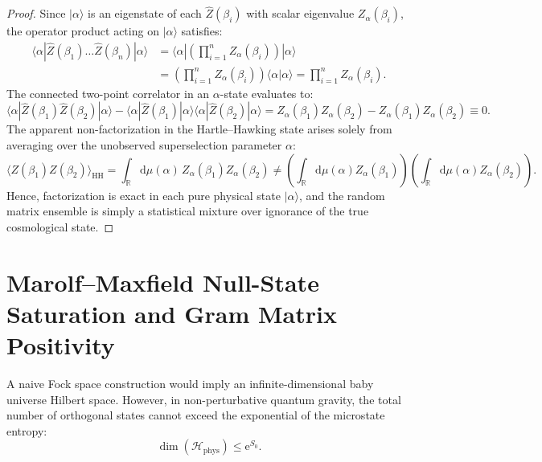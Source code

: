 \documentclass[11pt,a4paper,reqno]{article}
\theoremstyle{plain}
\theoremstyle{definition}
\theoremstyle{remark}
\numberwithin{equation}{section}
\newcommand{\R}{\mathbb{R}}
\newcommand{\Hphys}{\mathcal{H}_{\mathrm{phys}}}
\newcommand{\Zop}{\widehat{Z}}
\newcommand{\diff}{\mathrm{d}}
\begin{document}
\begin{proof}
Since $|\alpha\rangle$ is an eigenstate of each $\Zop(\beta_i)$ with scalar eigenvalue $Z_\alpha(\beta_i)$, the operator product acting on $|\alpha\rangle$ satisfies:
\begin{align}
  \langle \alpha | \Zop(\beta_1) \dots \Zop(\beta_n) | \alpha \rangle &= \langle \alpha | \left( \prod_{i=1}^n Z_\alpha(\beta_i) \right) | \alpha \rangle \nonumber\\
  &= \left( \prod_{i=1}^n Z_\alpha(\beta_i) \right) \langle \alpha | \alpha \rangle = \prod_{i=1}^n Z_\alpha(\beta_i).
\end{align}
The connected two-point correlator in an $\alpha$-state evaluates to:
\begin{equation}
  \langle \alpha | \Zop(\beta_1) \Zop(\beta_2) | \alpha \rangle - \langle \alpha | \Zop(\beta_1) | \alpha \rangle \langle \alpha | \Zop(\beta_2) | \alpha \rangle = Z_\alpha(\beta_1) Z_\alpha(\beta_2) - Z_\alpha(\beta_1) Z_\alpha(\beta_2) \equiv 0.
\end{equation}
The apparent non-factorization in the Hartle--Hawking state arises solely from averaging over the unobserved superselection parameter $\alpha$:
\begin{equation}
  \langle Z(\beta_1) Z(\beta_2) \rangle_{\mathrm{HH}} = \int_{\R} \diff\mu(\alpha) \, Z_\alpha(\beta_1) Z_\alpha(\beta_2) \neq \left( \int_{\R} \diff\mu(\alpha) Z_\alpha(\beta_1) \right) \left( \int_{\R} \diff\mu(\alpha) Z_\alpha(\beta_2) \right).
\end{equation}
Hence, factorization is exact in each pure physical state $|\alpha\rangle$, and the random matrix ensemble is simply a statistical mixture over ignorance of the true cosmological state.
\end{proof}

\section{Marolf--Maxfield Null-State Saturation and Gram Matrix Positivity}
\label{sec:null_states}

A naive Fock space construction would imply an infinite-dimensional baby universe Hilbert space. However, in non-perturbative quantum gravity, the total number of orthogonal states cannot exceed the exponential of the microstate entropy:
\begin{equation}
  \dim(\Hphys) \le \mathrm{e}^{S_0}.
\end{equation}
\end{document}
